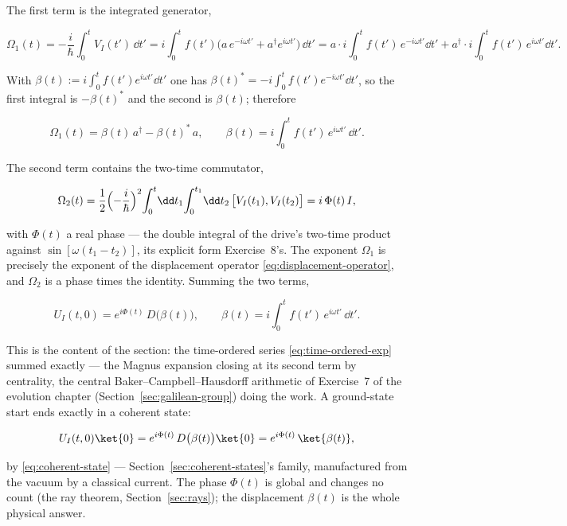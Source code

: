 The first term is the integrated generator,
\begin{linenomath}
    \begin{equation*}
        \Omega_1(t) = -\frac{i}{\hbar}\int_0^t V_I(t')\,\dd t'
        = i\int_0^t f(t')\bigl(a\,e^{-i\omega t'} + a^\dagger e^{i\omega t'}\bigr)\,\dd t'
        = a\cdot i\!\int_0^t\!f(t')\,e^{-i\omega t'}\dd t'
          + a^\dagger\cdot i\!\int_0^t\!f(t')\,e^{i\omega t'}\dd t' .
    \end{equation*}
\end{linenomath}
With $\beta(t):=i\int_0^t f(t')e^{i\omega t'}\dd t'$ one has $\beta(t)^{*}=-i\int_0^t f(t')e^{-i\omega t'}\dd t'$, so the first integral is $-\beta(t)^{*}$ and the second is $\beta(t)$; therefore
\begin{linenomath}
    \begin{equation*}
        \Omega_1(t) = \beta(t)\,a^\dagger - \beta(t)^{*}\,a,
        \qquad
        \beta(t) = i\int_0^t f(t')\,e^{i\omega t'}\,\dd t' .
    \end{equation*}
\end{linenomath}
The second term contains the two-time commutator,
\begin{linenomath}
    \begin{equation*}
        \Omega_2(t) = \frac12\Bigl(-\frac{i}{\hbar}\Bigr)^2\!\int_0^t\!\dd t_1\!\int_0^{t_1}\!\dd t_2\,\bigl[V_I(t_1), V_I(t_2)\bigr] = i\,\Phi(t)\,I ,
    \end{equation*}
\end{linenomath}
with $\Phi(t)$ a real phase --- the double integral of the drive's two-time product against $\sin[\omega(t_1 - t_2)]$, its explicit form Exercise~8's. The exponent $\Omega_1$ is precisely the exponent of the displacement operator \eqref{eq:displacement-operator}, and $\Omega_2$ is a phase times the identity. Summing the two terms,
\begin{linenomath}
    \begin{equation}
        U_I(t, 0) = e^{i\Phi(t)}\,D\bigl(\beta(t)\bigr),
        \qquad
        \beta(t) = i\int_0^t f(t')\,e^{i\omega t'}\,\dd t' .
        \label{eq:displacement-solution}
    \end{equation}
\end{linenomath}
This is the content of the section: the time-ordered series \eqref{eq:time-ordered-exp} summed exactly --- the Magnus expansion closing at its second term by centrality, the central Baker--Campbell--Hausdorff arithmetic of Exercise~7 of the evolution chapter (Section~\ref{sec:galilean-group}) doing the work. A ground-state start ends exactly in a coherent state:
\begin{linenomath}
    \begin{equation*}
        U_I(t, 0)\ket{0} = e^{i\Phi(t)}\,D\bigl(\beta(t)\bigr)\ket{0} = e^{i\Phi(t)}\,\ket{\beta(t)} ,
    \end{equation*}
\end{linenomath}
by \eqref{eq:coherent-state} --- Section~\ref{sec:coherent-states}'s family, manufactured from the vacuum by a classical current. The phase $\Phi(t)$ is global and changes no count (the ray theorem, Section~\ref{sec:rays}); the displacement $\beta(t)$ is the whole physical answer.


